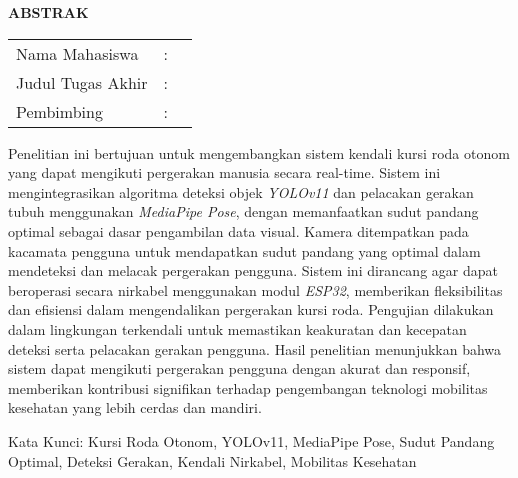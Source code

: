 \begin{center}
  \large\textbf{ABSTRAK}
\end{center}


\vspace{2ex}

\begingroup
\setlength{\tabcolsep}{0pt}

\noindent
\begin{tabularx}{\textwidth}{l >{\centering}m{2em} X}
  Nama Mahasiswa    & : & \name{}         \\

  Judul Tugas Akhir & : & \tatitle{}      \\

  Pembimbing        & : & \advisor{}   \\
\end{tabularx}
\endgroup

Penelitian ini bertujuan untuk mengembangkan sistem kendali kursi roda otonom yang dapat mengikuti pergerakan manusia secara real-time. Sistem ini mengintegrasikan algoritma deteksi objek \emph{YOLOv11} dan pelacakan gerakan tubuh menggunakan \emph{MediaPipe Pose}, dengan memanfaatkan sudut pandang optimal sebagai dasar pengambilan data visual. Kamera ditempatkan pada kacamata pengguna untuk mendapatkan sudut pandang yang optimal dalam mendeteksi dan melacak pergerakan pengguna. Sistem ini dirancang agar dapat beroperasi secara nirkabel menggunakan modul \emph{ESP32}, memberikan fleksibilitas dan efisiensi dalam mengendalikan pergerakan kursi roda. Pengujian dilakukan dalam lingkungan terkendali untuk memastikan keakuratan dan kecepatan deteksi serta pelacakan gerakan pengguna. Hasil penelitian menunjukkan bahwa sistem dapat mengikuti pergerakan pengguna dengan akurat dan responsif, memberikan kontribusi signifikan terhadap pengembangan teknologi mobilitas kesehatan yang lebih cerdas dan mandiri.

Kata Kunci: Kursi Roda Otonom, YOLOv11, MediaPipe Pose, Sudut Pandang Optimal, Deteksi Gerakan, Kendali Nirkabel, Mobilitas Kesehatan
